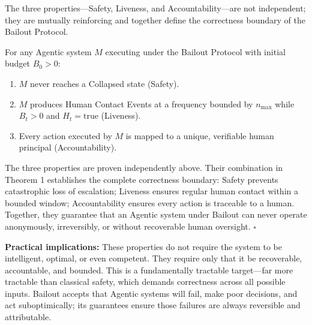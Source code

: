 The three properties—Safety, Liveness, and Accountability—are not independent; they are mutually reinforcing and together define the correctness boundary of the Bailout Protocol.

\begin{theorem}
For any Agentic system $M$ executing under the Bailout Protocol with initial budget $B_0 > 0$:
\begin{enumerate}
    \item $M$ never reaches a Collapsed state (Safety).
    \item $M$ produces Human Contact Events at a frequency bounded by $n_\text{max}$ while $B_t > 0$ and $H_t = \text{true}$ (Liveness).
    \item Every action executed by $M$ is mapped to a unique, verifiable human principal (Accountability).
\end{enumerate}
\end{theorem}

\begin{Proof}
The three properties are proven independently above. Their combination in Theorem 1 establishes the complete correctness boundary: Safety prevents catastrophic loss of escalation; Liveness ensures regular human contact within a bounded window; Accountability ensures every action is traceable to a human. Together, they guarantee that an Agentic system under Bailout can never operate anonymously, irreversibly, or without recoverable human oversight. $\square$
\end{Proof}

\textbf{Practical implications:} These properties do not require the system to be intelligent, optimal, or even competent. They require only that it be recoverable, accountable, and bounded. This is a fundamentally tractable target—far more tractable than classical safety, which demands correctness across all possible inputs. Bailout accepts that Agentic systems will fail, make poor decisions, and act suboptimically; its guarantees ensure those failures are always reversible and attributable.